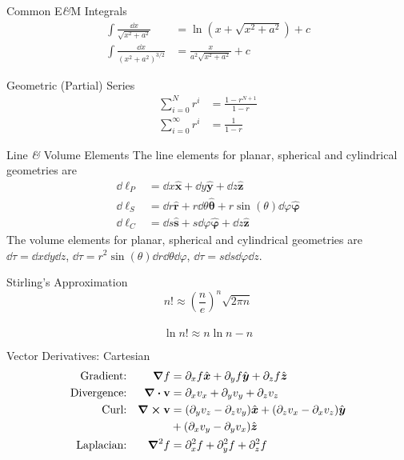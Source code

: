 \documentclass[avery5371,grid]{flashcards}
\begin{document}
\begin{flashcard}[Formula]{Common E\textit{\&}M Integrals}
	\begin{align*}
		\int\frac{\dd x}{\sqrt{x^2+a^2}} &= \ln(x+\sqrt{x^2+a^2})+c\\
		\int\frac{\dd x}{(x^2+a^2)^{3/2}} &= \frac{x}{a^2\sqrt{x^2+a^2}}+c
	\end{align*}
\end{flashcard}

\begin{flashcard}[Formula]{Geometric (Partial) Series}
	\begin{align*}
		\sum_{i=0}^N r^i &= \frac{1 - r^{N+1}}{1 - r} \\
		\sum_{i=0}^{\infty}  r^i &= \frac{1}{1 - r}
	\end{align*}
\end{flashcard}

\begin{flashcard}[Definition]{Line \textit{\&} Volume Elements}
	The line elements for planar, spherical and cylindrical geometries are
	\begin{align*}
		\dd\boldsymbol{\ell}_P&=\dd x\hat{\boldsymbol{x}} + \dd y\hat{\boldsymbol{y}} + \dd z\hat{\boldsymbol{z}}\\
		\dd\boldsymbol{\ell}_S&=\dd r\hat{\boldsymbol{r}}+r \dd\theta\hat{\boldsymbol{\theta}} +r\sin(\theta)\dd\varphi\hat{\boldsymbol{\varphi}}\\
		\dd\boldsymbol{\ell}_C&=\dd s\hat{\boldsymbol{s}} + s\dd\varphi\hat{\boldsymbol{\varphi}}+\dd z\hat{\boldsymbol{z}}
	\end{align*}
	The volume elements for planar, spherical and cylindrical geometries are $\dd\tau= \dd x\dd y\dd z$, $\dd\tau=r^2\sin(\theta)\dd r\dd\theta\dd\varphi$, $\dd\tau=s\dd s\dd\varphi\dd z$.
\end{flashcard}

\begin{flashcard}[Formula]{Stirling's Approximation}
	\[ n! {\approx}  (\frac ne)^n \sqrt{2{\pi}n} \] \\
	\[ \ln n! {\approx}  n\ln n - n \]
\end{flashcard}

\begin{flashcard}[Definition]{Vector Derivatives: Cartesian}
	\begin{align*}
		\text{Gradient:}&&\grad f &= \partial_x f\hat{\boldsymbol{x}} + \partial_y f\hat{\boldsymbol{y}} + \partial_z f\hat{\boldsymbol{z}}\\
		\text{Divergence:}&&\div \mathbf{v} &= \partial_x{v_x}+\partial_y{v_y}+\partial_z{v_z}\\
		\text{Curl:}&&\curl\mathbf{v} &=\qty(\partial_{y}{v_z}-\partial_{z}{v_y})\hat{\boldsymbol{x}} + \qty(\partial_{z}{v_x}-\partial_{x}{v_z})\hat{\boldsymbol{y}} \\
		&&&+\qty(\partial_xv_y-\partial_y v_x)\hat{\boldsymbol{z}}\\
		\text{Laplacian:}&&\grad^2 f &= \partial^2_x f +\partial^2_y f + \partial^2_z f
	\end{align*}
\end{flashcard}
\end{document}
